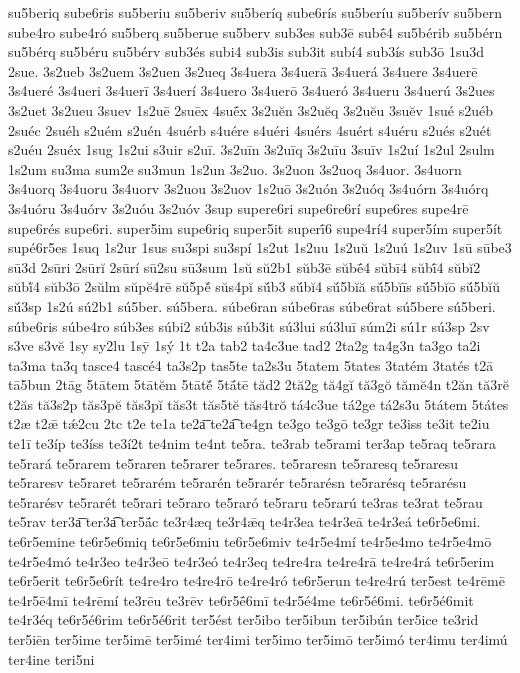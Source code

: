 {su5beriq
sube6ris
su5beriu
su5beriv
su5beríq
sube6rís
su5beríu
su5berív
su5bern
sube4ro
sube4ró
su5berq
su5berue
su5berv
sub3es
sub3ē
subḗ4
su5bérib
su5bérn
su5bérq
su5béru
su5bérv
sub3és
subi4
sub3is
sub3it
subí4
sub3ís
sub3ō
1su3d
2sue.
3s2ueb
3s2uem
3s2uen
3s2ueq
3s4uera
3s4uerā
3s4uerá
3s4uere
3s4uerē
3s4ueré
3s4ueri
3s4uerī
3s4uerí
3s4uero
3s4uerō
3s4ueró
3s4ueru
3s4uerú
3s2ues
3s2uet
3s2ueu
3suev
1s2uē
2suēx
4suḗx
3s2uĕn
3s2uĕq
3s2uĕu
3suĕv
1sué
s2uéb
2suéc
2suéh
s2uém
s2uén
4suérb
s4uére
s4uéri
4suérs
4suért
s4uéru
s2ués
s2uét
s2uéu
2suéx
1sug
1s2ui
s3uir
s2uī.
3s2uīn
3s2uīq
3s2uīu
3suīv
1s2uí
1s2ul
2sulm
1s2um
su3ma
sum2e
su3mun
1s2un
3s2uo.
3s2uon
3s2uoq
3s4uor.
3s4uorn
3s4uorq
3s4uoru
3s4uorv
3s2uou
3s2uov
1s2uō
3s2uón
3s2uóq
3s4uórn
3s4uórq
3s4uóru
3s4uórv
3s2uóu
3s2uóv
3sup
supere6ri
supe6re6rí
supe6res
supe4rē
supe6rés
supe6ri.
super5im
supe6riq
super5it
superī́6
supe4rí4
super5ím
super5ít
supé6r5es
1suq
1s2ur
1sus
su3spi
su3spí
1s2ut
1s2uu
1s2uŭ
1s2uú
1s2uv
1sū
sūbe3
sū3d
2sūri
2sūrĭ
2sūrí
sū2su
sū3sum
1sŭ
sŭ2b1
sŭb3ē
sŭbḗ4
sŭbī4
sŭbī́4
sŭbĭ2
sŭbĭ́4
sŭb3ō
2sŭlm
sŭpĕ4rē
sŭ5pĕ́
sŭs4pĭ
sŭ́b3
sŭ́bĭ4
sŭ́5bĭă
sŭ́5bĭīs
sŭ́5bĭō
sŭ́5bĭŭ
sŭ́3sp
1s2ú
sú2b1
sú5ber.
sú5bera.
súbe6ran
súbe6ras
súbe6rat
sú5bere
sú5beri.
súbe6ris
súbe4ro
súb3es
súbi2
súb3is
súb3it
sú3lui
sú3luī
súm2i
sú1r
sú3sp
2sv
s3ve
s3vĕ
1sy
sy2lu
1sȳ
1sý
1t
t2a
tab2
ta4c3ue
tad2
2ta2g
ta4g3n
ta3go
ta2i
ta3ma
ta3q
tasce4
tascé4
ta3s2p
tas5te
ta2s3u
5tatem
5tates
3tatém
3tatés
t2ā
tā5bun
2tāg
5tātem
5tātĕm
5tātĕ́
5tā́tē
tăd2
2tă2g
tă4gĭ
tă3gŏ
tămĕ4n
t2ăn
tă3rĕ
t2ăs
tă3s2p
tăs3pĕ
tăs3pĭ
tăs3t
tăs5tĕ
tăs4trŏ
tá4c3ue
tá2ge
tá2s3u
5tátem
5tátes
t2æ
t2ǣ
tǽ2cu
2tc
t2e
te1a
te2a͞
te2a͡
te4gn
te3go
te3gō
te3gr
te3iss
te3it
te2iu
te1ī
te3íp
te3íss
te3í2t
te4nim
te4nt
te5ra.
te3rab
te5rami
ter3ap
te5raq
te5rara
te5rará
te5rarem
te5raren
te5rarer
te5rares.
te5raresn
te5raresq
te5raresu
te5raresv
te5raret
te5rarém
te5rarén
te5rarér
te5rarésn
te5rarésq
te5rarésu
te5rarésv
te5rarét
te5rari
te5raro
te5raró
te5raru
te5rarú
te3ras
te3rat
te5rau
te5rav
ter3a͞
ter3a͡
ter5ā́c
te3r4æq
te3r4ǣq
te4r3ea
te4r3eā
te4r3eá
te6r5e6mi.
te6r5emine
te6r5e6miq
te6r5e6miu
te6r5e6miv
te4r5e4mí
te4r5e4mo
te4r5e4mō
te4r5e4mó
te4r3eo
te4r3eō
te4r3eó
te4r3eq
te4re4ra
te4re4rā
te4re4rá
te6r5erim
te6r5erit
te6r5e6rít
te4re4ro
te4re4rō
te4re4ró
te6r5erun
te4re4rú
ter5est
te4rēmē
te4r5ē4mī
te4rēmí
te3rēu
te3rēv
te6r5ḗ6mī
te4r5é4me
te6r5é6mi.
te6r5é6mit
te4r3éq
te6r5é6rim
te6r5é6rit
ter5ést
ter5ibo
ter5ibun
ter5ibún
ter5ice
te3rid
ter5iēn
ter5ime
ter5imē
ter5imé
ter4imi
ter5imo
ter5imō
ter5imó
ter4imu
ter4imú
ter4ine
teri5ni
}
